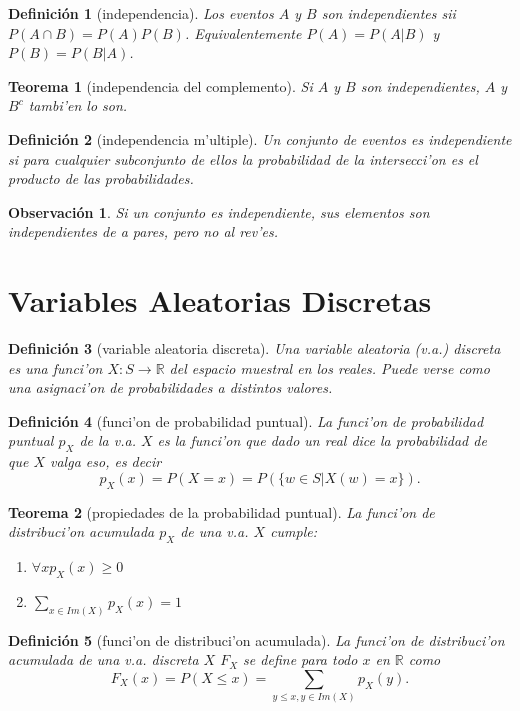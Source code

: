 \documentclass[a4paper,spanish]{article}
\newcommand{\R}[0]{\mathbb{R}}
\newtheorem{teo}{Teorema}
\newtheorem{defi}{Definici\'on}
\newtheorem{obs}{Observaci\'on}
\begin{document}
\begin{defi}[independencia]
Los eventos $A$ y $B$ son independientes sii $P(A \cap B) = P(A)P(B)$. 
Equivalentemente $P(A) = P(A|B)$ y $P(B)=P(B|A)$.
\end{defi}

\begin{teo}[independencia del complemento]
Si $A$ y $B$ son independientes, $A$ y $B^c$ tambi'en lo son.
\end{teo}

\begin{defi}[independencia m'ultiple]
Un conjunto de eventos es independiente si para cualquier subconjunto de ellos
la probabilidad de la intersecci'on es el producto de las probabilidades.
\end{defi}

\begin{obs}
Si un conjunto es independiente, sus elementos son independientes de a pares,
pero no al rev'es.
\end{obs}

\section{Variables Aleatorias Discretas}

\begin{defi}[variable aleatoria discreta]
Una \emph{variable aleatoria (v.a.) discreta} es una funci'on
$X : S \to \R$ del espacio muestral en los reales. Puede verse como 
una asignaci'on de probabilidades a distintos valores.
\end{defi}

\begin{defi}[funci'on de probabilidad puntual]
La \emph{funci'on de probabilidad puntual} $p_X$ de la v.a. $X$ es la funci'on
que dado un real dice la probabilidad de que $X$ valga eso, es decir
$$p_X(x) = P(X = x) = P(\{w \in S | X(w) = x\}).$$
\end{defi}

\begin{teo}[propiedades de la probabilidad puntual]
La funci'on de distribuci'on acumulada $p_X$ de una v.a. $X$ cumple:
\begin{enumerate}
\item $\forall x p_X(x) \geq 0$
\item $\sum_{x \in Im(X)} p_X(x) = 1$
\end{enumerate}
\end{teo}

\begin{defi}[funci'on de distribuci'on acumulada]
La \emph{funci'on de distribuci'on acumulada} de una v.a. discreta $X$ $F_X$
se define para todo $x$ en $\R$ como
$$F_X(x) = P(X \leq x) = \sum_{y \leq x, y \in Im(X)} p_X(y).$$
\end{defi}
\end{document}
